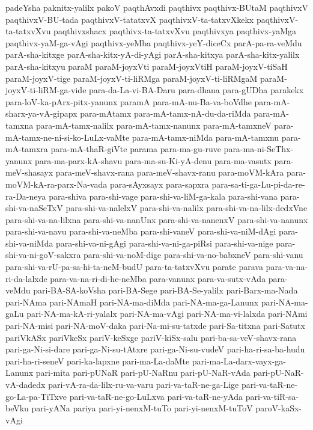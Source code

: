 {padeYsha
paknitx-yalilx
pakoV
paqthAvxdi
paqthivx
paqthivx-BUtaM
paqthivxV
paqthivxV-BU-tada
paqthivxV-tatatxvX
paqthivxV-ta-tatxvXkekx
paqthivxV-ta-tatxvXvu
paqthivxshacx
paqthivx-ta-tatxvXvu
paqthivxya
paqthivx-yaMga
paqthivx-yaM-ga-vAgi
paqthivx-yeMba
paqthivx-yeY-diceCx
parA-pa-ra-veMdu
parA-sha-kitxge
parA-sha-kitx-yA-di-yAgi
parA-sha-kitxya
parA-sha-kitx-yalilx
parA-sha-kitxyu
paraM
paraM-joyxVti
paraM-joyxVtiH
paraM-joyxV-tiSaH
paraM-joyxV-tige
paraM-joyxV-ti-liRMga
paraM-joyxV-ti-liRMgaM
paraM-joyxV-ti-liRM-ga-vide
para-da-La-vi-BA-Daru
para-dhana
para-gUDha
parakekx
para-loV-ka-pArx-pitx-yanunx
paramA
para-mA-nu-Ba-va-boVdhe
para-mA-sharx-ya-vA-gipapx
para-mAtamx
para-mA-tamx-nA-du-da-riMda
para-mA-tamxna
para-mA-tamx-nalilx
para-mA-tamx-nanunx
para-mA-tamxneV
para-mA-tamx-ne-ni-si-ko-LuLx-vaMte
para-mA-tamx-niMda
para-mA-tamxnu
para-mA-tamxra
para-mA-thaR-giVte
parama
para-ma-gu-ruve
para-ma-ni-SeThx-yanunx
para-ma-parx-kA-shavu
para-ma-su-Ki-yA-denu
para-ma-vasutx
para-meV-shasayx
para-meV-shavx-rana
para-meV-shavx-ranu
para-moVM-kAra
para-moVM-kA-ra-parx-Na-vada
para-sAyxsayx
para-sapxra
para-sa-ti-ga-Lu-pi-da-re-ra-Da-neya
para-shiva
para-shi-vage
para-shi-va-liM-ga-kala
para-shi-vana
para-shi-va-naSeTxV
para-shi-va-nalelxV
para-shi-va-nalilx
para-shi-va-na-lilx-dedxVne
para-shi-va-na-lilxna
para-shi-va-nanUnx
para-shi-va-nanenxV
para-shi-va-nanunx
para-shi-va-navu
para-shi-va-neMba
para-shi-vaneV
para-shi-va-niM-dAgi
para-shi-va-niMda
para-shi-va-ni-gAgi
para-shi-va-ni-ga-piRsi
para-shi-va-nige
para-shi-va-ni-goV-sakxra
para-shi-va-noM-dige
para-shi-va-no-babxneV
para-shi-vanu
para-shi-va-rU-pa-sa-hi-ta-neM-budU
para-ta-tatxvXvu
parate
parava
para-va-na-ri-da-lalxde
para-va-na-ri-di-he-neMba
para-vanunx
para-va-sutx-vAda
para-veMdu
pari-BA-SA-koVsha
pari-BA-Sege
pari-BA-Se-yalilx
pari-Barx-ma-Nada
pari-NAma
pari-NAmaH
pari-NA-ma-diMda
pari-NA-ma-ga-Lanunx
pari-NA-ma-gaLu
pari-NA-ma-kA-ri-yalalx
pari-NA-ma-vAgi
pari-NA-ma-vi-lalxda
pari-NAmi
pari-NA-misi
pari-NA-moV-daka
pari-Na-mi-su-tatxde
pari-Sa-titxna
pari-Satutx
pariVkASx
pariVkeSx
pariV-keSxge
pariV-kiSx-salu
pari-ba-sa-veV-shavx-rana
pari-ga-Ni-si-dare
pari-ga-Ni-su-tAtxre
pari-ga-Ni-su-vudeV
pari-ha-ri-sa-ba-hudu
pari-ha-ri-seneV
pari-ka-lapxne
pari-ma-La-daMte
pari-ma-La-darx-vayx-ga-Lanunx
pari-mita
pari-pUNaR
pari-pU-NaRnu
pari-pU-NaR-vAda
pari-pU-NaR-vA-dadedx
pari-vA-ra-da-lilx-ru-va-varu
pari-va-taR-ne-ga-Lige
pari-va-taR-ne-go-La-pa-TiTxve
pari-va-taR-ne-go-LuLxva
pari-va-taR-ne-yAda
pari-va-tiR-sa-beVku
pari-yANa
pariya
pari-yi-nenxM-tuTo
pari-yi-nenxM-tuToV
paroV-kaSx-vAgi
}
